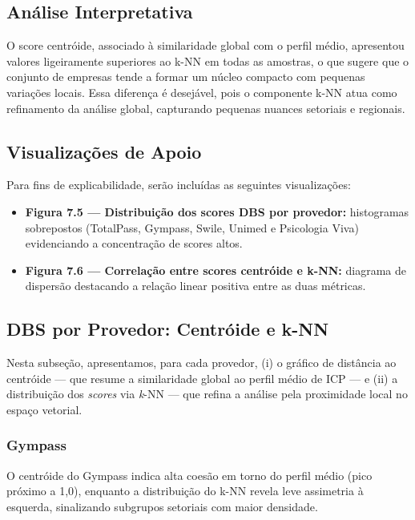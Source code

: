 \subsection*{Análise Interpretativa}

O score centróide, associado à similaridade global com o perfil médio, apresentou valores ligeiramente superiores ao k-NN em todas as amostras, o que sugere que o conjunto de empresas tende a formar um núcleo compacto com pequenas variações locais. Essa diferença é desejável, pois o componente k-NN atua como refinamento da análise global, capturando pequenas nuances setoriais e regionais.


\subsection*{Visualizações de Apoio}

Para fins de explicabilidade, serão incluídas as seguintes visualizações:

\begin{itemize}
    \item \textbf{Figura 7.5 — Distribuição dos scores DBS por provedor:} histogramas sobrepostos (TotalPass, Gympass, Swile, Unimed e Psicologia Viva) evidenciando a concentração de scores altos.
    \item \textbf{Figura 7.6 — Correlação entre scores centróide e k-NN:} diagrama de dispersão destacando a relação linear positiva entre as duas métricas.
\end{itemize}

\subsection{DBS por Provedor: Centróide e k-NN}

\noindent
Nesta subseção, apresentamos, para cada provedor, (i) o gráfico de distância ao centróide — que resume a similaridade global ao perfil médio de ICP — e (ii) a distribuição dos \textit{scores} via \textit{k}-NN — que refina a análise pela proximidade local no espaço vetorial.

\subsubsection*{Gympass}
\noindent
O centróide do Gympass indica alta coesão em torno do perfil médio (pico próximo a 1,0), enquanto a distribuição do k-NN revela leve assimetria à esquerda, sinalizando subgrupos setoriais com maior densidade.

